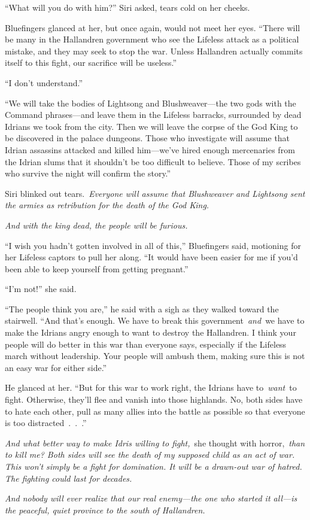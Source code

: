 “What will you do with him?” Siri asked, tears cold on her cheeks.

Bluefingers glanced at her, but once again, would not meet her eyes. “There will be many in the Hallandren government who see the Lifeless attack as a political mistake, and they may seek to stop the war. Unless Hallandren actually commits itself to this fight, our sacrifice will be useless.”

“I don’t understand.”

“We will take the bodies of Lightsong and Blushweaver—the two gods with the Command phrases—and leave them in the Lifeless barracks, surrounded by dead Idrians we took from the city. Then we will leave the corpse of the God King to be discovered in the palace dungeons. Those who investigate will assume that Idrian assassins attacked and killed him—we’ve hired enough mercenaries from the Idrian slums that it shouldn’t be too difficult to believe. Those of my scribes who survive the night will confirm the story.”

Siri blinked out tears.~\textit{Everyone will assume that Blushweaver and Lightsong sent the armies as retribution for the death of the God King.}

\textit{And with the king dead, the people will be furious.}

“I wish you hadn’t gotten involved in all of this,” Bluefingers said, motioning for her Lifeless captors to pull her along. “It would have been easier for me if you’d been able to keep yourself from getting pregnant.”

“I’m not!” she said.

“The people think you are,” he said with a sigh as they walked toward the stairwell. “And that’s enough. We have to break this government~\textit{and}~we have to make the Idrians angry enough to want to destroy the Hallandren. I think your people will do better in this war than everyone says, especially if the Lifeless march without leadership. Your people will ambush them, making sure this is not an easy war for either side.”

He glanced at her. “But for this war to work right, the Idrians have to~\textit{want}~to fight. Otherwise, they’ll flee and vanish into those highlands. No, both sides have to hate each other, pull as many allies into the battle as possible so that everyone is too distracted~.~.~.”

\textit{And what better way to make Idris willing to fight,}~she thought with horror,~\textit{than to kill me? Both sides will see the death of my supposed child as an act of war. This won’t simply be a fight for domination. It will be a drawn-out war of hatred. The fighting could last for decades.}

\textit{And nobody will ever realize that our real enemy—the one who started it all—is the peaceful, quiet province to the south of Hallandren.}

